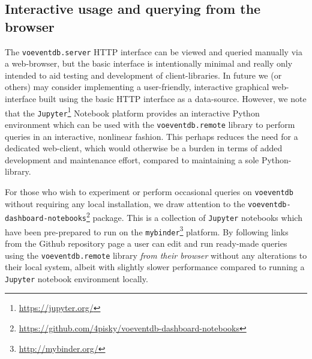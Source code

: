 \documentclass[5p,authoryear]{elsarticle}
\begin{document}
\subsection{Interactive usage and querying from the browser}
The \texttt{voeventdb.server} HTTP interface can be viewed and queried manually via a web-browser, but the basic interface is intentionally minimal and really only intended to aid testing and development of client-libraries.
In future we (or others) may consider implementing a user-friendly, interactive graphical web-interface built using the basic HTTP interface as a data-source. 
However, we note that the \texttt{Jupyter}\footnote{\url{https://jupyter.org/}} Notebook platform provides an interactive Python environment which can be used with the \texttt{voeventdb.remote} library to perform queries in an interactive, nonlinear fashion. 
This perhaps reduces the need for a dedicated web-client, which would otherwise be a burden in terms of added development and maintenance effort, compared to maintaining a sole Python-library. 

\begin{sloppypar}
 For those who wish to experiment or perform occasional queries on \texttt{voeventdb} without requiring any local installation, we draw attention to the \texttt{voeventdb-dashboard-notebooks}\footnote{\url{https://github.com/4pisky/voeventdb-dashboard-notebooks}} package. 
This is a collection of \texttt{Jupyter} notebooks which have been pre-prepared to run on the \texttt{mybinder}\footnote{\url{http://mybinder.org/}} platform. 
By following links from the Github repository page a user can edit and run ready-made queries using the \texttt{voeventdb.remote} library \emph{from their browser} without any alterations to their local system, albeit with slightly slower performance compared to running a \texttt{Jupyter} notebook environment locally.
\end{sloppypar}
\end{document}
